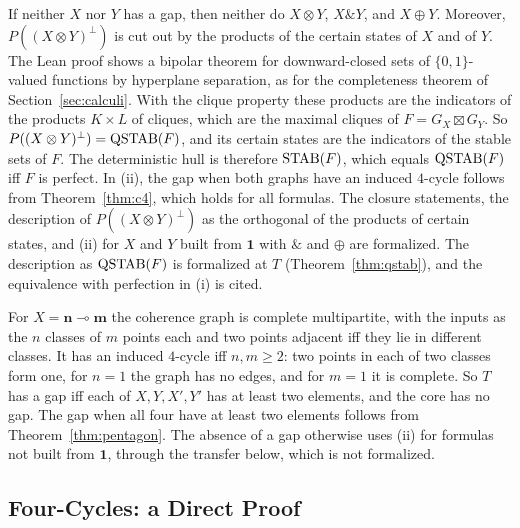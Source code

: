 \noindent
If neither $X$ nor $Y$ has a gap, then neither do $X \otimes Y$,
$X \mathbin{\&} Y$, and $X \oplus Y$. Moreover, $P((X \otimes Y)^{\perp})$ is
cut out by the products of the certain states of $X$ and of $Y$. The Lean proof shows a bipolar theorem for downward-closed sets of
$\{0,1\}$-valued functions by hyperplane separation, as for the
completeness theorem of Section~\ref{sec:calculi}. With the
clique property these products are the indicators of the products
$K \times L$ of cliques, which are the maximal cliques of
$F = G_X \boxtimes G_Y$. So $P((X \otimes Y)^{\perp}) = \mathrm{QSTAB}(F)$, and its certain states are the
indicators of the stable sets of $F$. The deterministic hull is therefore $\mathrm{STAB}(F)$, which equals $\mathrm{QSTAB}(F)$ iff $F$ is
perfect. In (ii), the gap when both graphs
have an induced $4$-cycle follows from Theorem~\ref{thm:c4}, which holds for all
formulas. The closure statements, the description of
$P((X \otimes Y)^{\perp})$ as the orthogonal of the products of certain
states, and (ii) for $X$ and $Y$ built from $\mathbf{1}$ with
$\mathbin{\&}$ and $\oplus$ are formalized. The description as
$\mathrm{QSTAB}(F)$ is formalized at $T$ (Theorem~\ref{thm:qstab}), and the
equivalence with perfection in (i) is cited.

For $X = \mathbf{n} \multimap \mathbf{m}$ the coherence graph is complete
multipartite, with the inputs as the $n$ classes of $m$ points each and
two points adjacent iff they lie in different classes. It has an induced
$4$-cycle iff $n, m \ge 2$: two points in each of two classes form one,
for $n = 1$ the graph has no edges, and for $m = 1$ it is complete. So $T$ has a gap iff each of $X, Y, X', Y'$
has at least two elements, and the core has no gap.
The gap when all four have at least two elements follows from Theorem~\ref{thm:pentagon}. The absence of a gap otherwise uses (ii) for
formulas not built from $\mathbf{1}$, through the transfer below, which is
not formalized.

\subsection{Four-Cycles: a Direct Proof}
\label{sec:exact-direct}

